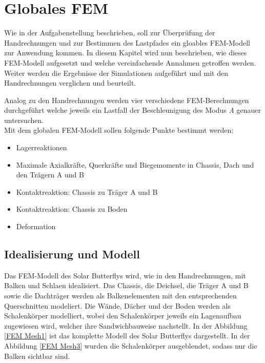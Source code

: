 \section{Globales FEM}
Wie in der Aufgabenstellung beschrieben, soll zur Überprüfung der Handrechnungen und zur Bestimmen des Lastpfades ein gloables FEM-Modell zur Anwendung kommen. In diesem Kapitel wird nun beschrieben, wie dieses FEM-Modell aufgesetzt und welche vereinfachende Annahmen getroffen werden. Weiter werden die Ergebnisse der Simulationen aufgeführt und mit den Handrechnungen verglichen und beurteilt.


Analog zu den Handrechnungen werden vier verschiedene FEM-Berechnungen durchgeführt welche jeweils ein Lastfall der Beschleunigung des Modus \emph{A} genauer untersuchen.\\

Mit dem globalen FEM-Modell sollen folgende Punkte bestimmt werden:
\begin{itemize}
  \item Lagerreaktionen
  \item Maximale Axialkräfte, Querkräfte und Biegemomente in Chassis, Dach und den Trägern A und B
  \item Kontaktreaktion: Chassis zu Träger A und B
  \item Kontaktreaktion: Chassis zu Boden
  \item Deformation
\end{itemize}

\subsection{Idealisierung und Modell}
Das FEM-Modell des Solar Butterflys wird, wie in den Handrechnungen, mit Balken und Schlaen idealisiert. Das Chassis, die Deichsel, die Träger A und B sowie die Dachträger werden als Balkenelementen mit den entsprechenden Querschnitten modeliert. Die Wände, Dächer und der Boden werden als Schalenkörper modelliert, wobei den Schalenkörper jeweils ein Lagenaufbau zugewiesen wird, welcher ihre Sandwichbauweise nachstellt. In der Abbildung \ref{FEM Mesh1} ist das komplette Modell des Solar Butterflys dargestellt. In der Abbildung \ref{FEM Mesh3} wurden die Schalenkörper ausgeblendet, sodass nur die Balken sichtbar sind.

